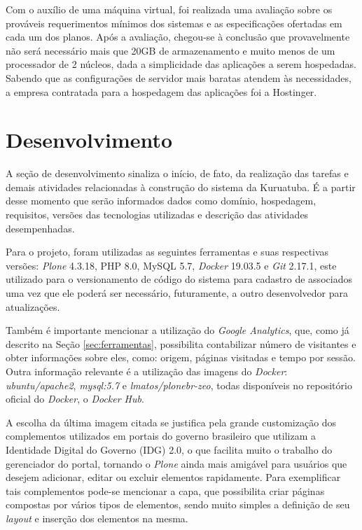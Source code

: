Com o auxílio de uma máquina virtual, foi realizada uma avaliação sobre os prováveis requerimentos mínimos dos sistemas e as especificações ofertadas em cada um dos planos. Após a avaliação, chegou-se à conclusão que provavelmente não será necessário mais que 20GB de armazenamento e muito menos de um processador de 2 núcleos, dada a simplicidade das aplicações a serem hospedadas. Sabendo que as configurações de servidor mais baratas atendem às necessidades, a empresa contratada para a hospedagem das aplicações foi a Hostinger.   

\hspace{2.5cm}
\section{Desenvolvimento}
\label{sec:desenvolvimento}

\hspace{2.5cm}

A seção de desenvolvimento sinaliza o início, de fato, da realização das tarefas e demais atividades relacionadas à construção do sistema da Kuruatuba. É a partir desse momento que serão informados dados como domínio, hospedagem, requisitos, versões das tecnologias utilizadas e descrição das atividades desempenhadas.

Para o projeto, foram utilizadas as seguintes ferramentas e suas respectivas versões: \textit{Plone} 4.3.18, PHP 8.0, MySQL 5.7, \textit{Docker} 19.03.5 e \textit{Git} 2.17.1, este utilizado para o versionamento de código do sistema para cadastro de associados uma vez que ele poderá ser necessário, futuramente, a outro desenvolvedor para atualizações. 

Também é importante mencionar a utilização do \textit{Google Analytics}, que, como já descrito na Seção \ref{sec:ferramentas}, possibilita contabilizar número de visitantes e obter informações sobre eles, como: origem, páginas visitadas e tempo por sessão. Outra informação relevante é a utilização das imagens do \textit{Docker}: \textit{ubuntu/apache2}, \textit{mysql:5.7} e \textit{lmatos/plonebr-zeo}, todas disponíveis no repositório oficial do \textit{Docker}, o \textit{Docker Hub}. 

A escolha da última imagem citada se justifica pela grande customização dos complementos utilizados em portais do governo brasileiro que utilizam a Identidade Digital do Governo (IDG) 2.0, o que facilita muito o trabalho do gerenciador do portal, tornando o \textit{Plone} ainda mais amigável para usuários que desejem adicionar, editar ou excluir elementos rapidamente. Para exemplificar tais complementos pode-se mencionar a capa, que possibilita criar páginas compostas por vários tipos de elementos, sendo muito simples a definição de seu \textit{layout} e inserção dos elementos na mesma.  

